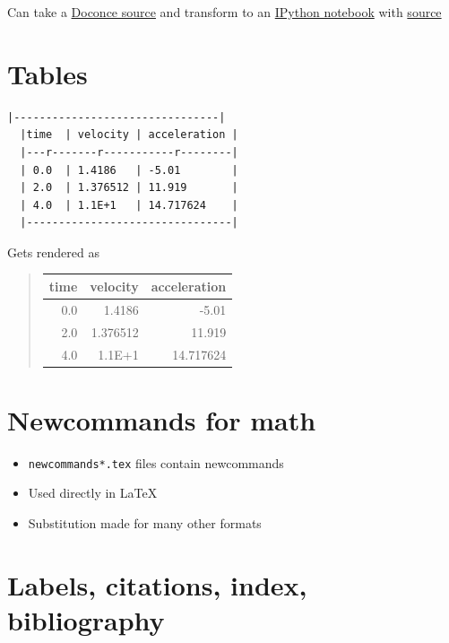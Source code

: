 \documentclass[%
twoside,                 %
final,                   %
chapterprefix=true,      %
open=right               %
10pt]{book}
\begin{document}
Can take a \href{{http://hplgit.github.com/teamods/writing_reports/_static/report.do.txt.html}}{Doconce source} and transform to an \href{{http://nbviewer.ipython.org/url/hplgit.github.com/teamods/writing_reports/_static/report.ipynb}}{IPython notebook} with \href{{http://hplgit.github.com/teamods/writing_reports/_static/report.ipynb.html}}{source}

\section*{Tables}

\begin{Verbatim}[numbers=none,fontsize=\fontsize{9pt}{9pt},baselinestretch=0.95]
  |--------------------------------|
  |time  | velocity | acceleration |
  |---r-------r-----------r--------|
  | 0.0  | 1.4186   | -5.01        |
  | 2.0  | 1.376512 | 11.919       |
  | 4.0  | 1.1E+1   | 14.717624    |
  |--------------------------------|
\end{Verbatim}
Gets rendered as


\begin{quote}\begin{tabular}{rrr}
\hline
\multicolumn{1}{c}{ time } & \multicolumn{1}{c}{ velocity } & \multicolumn{1}{c}{ acceleration } \\
\hline
0.0          & 1.4186       & -5.01        \\
2.0          & 1.376512     & 11.919       \\
4.0          & 1.1E+1       & 14.717624    \\
\hline
\end{tabular}\end{quote}

\noindent

\section*{Newcommands for math}

\begin{itemize}
 \item \Verb!newcommands*.tex! files contain newcommands

 \item Used directly in {\LaTeX}

 \item Substitution made for many other formats
\end{itemize}

\noindent
\section*{Labels, citations, index, bibliography}
\end{document}
